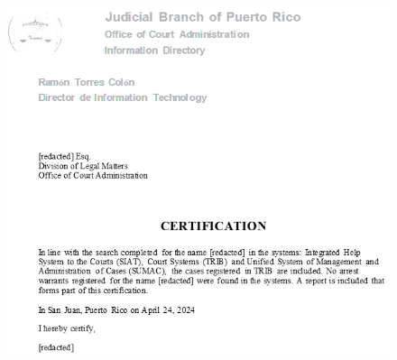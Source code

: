 \documentclass{article}
\begin{document}
\begin{figure}[H]
	\centering
	\includegraphics[width=\textwidth]{../sample_translations/target_2_3.png}
\end{figure}
\newpage


\
\end{document}
